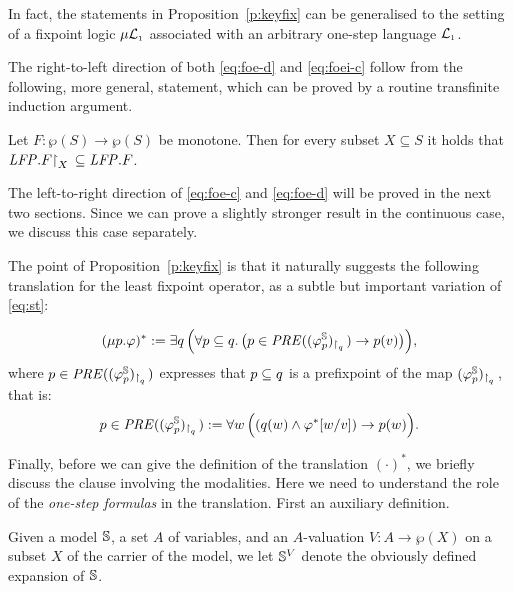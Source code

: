 \begin{remark}
In fact, the statements in Proposition~\ref{p:keyfix} can be generalised to the
setting of a fixpoint logic $\mu\mathcal{L}_{\scriptscriptstyle 1}$ associated with an arbitrary one-step 
language $\mathcal{L}_{\scriptscriptstyle 1}$.
\end{remark}

The right-to-left direction of both \eqref{eq:foe-d} and \eqref{eq:foei-c} follow
from the following, more general, statement, which can be proved by a routine 
transfinite induction argument.

\begin{proposition}
\label{p:rstfix}
Let $F:  \wp(S)\to \wp(S)$ be monotone.
Then for every subset $X \subseteq S$ it holds that $\mathit{LFP}. F{\upharpoonright}_{X}\,\subseteq 
\mathit{LFP}.F$.
\end{proposition}

The left-to-right direction of \eqref{eq:foe-c} and \eqref{eq:foe-d} 
will be proved in the next two sections.
Since we can prove a slightly stronger result in the continuous case, we discuss
this case separately.

\newcommand{\PRE}{\mathit{PRE}}
The point of Proposition~\ref{p:keyfix} is that it naturally suggests the
following translation for the least fixpoint operator, as a subtle but important 
variation of \eqref{eq:st}:

\begin{equation}
\label{eq:trlmu}
(\mu p. \varphi)^{*} \df 
   \exists q\,\Big(\forall  p \subseteq q.\,
      \big(p \in \PRE((\varphi^{\model}_{p})_{\rst{q}}) \to p(v)\big)\Big),
\end{equation}
where $p \in \PRE((\varphi^{\model}_{p})_{\rst{q}})$ expresses that $p \subseteq q$ 
is a prefixpoint of the map $(\varphi^{\mathbb{S}}_{p})_{{\upharpoonright}_{q}\,}$, that is:
\[
p  \in \PRE((\varphi^{\model}_{p})_{\rst{q}}) \df
\forall w\, \Big(
( q(w) \land \varphi^{*}[w/v]) \to p(w)
\Big).
\]

Finally, before we can give the definition of the translation $(\cdot)^{*}$, we
briefly discuss the clause involving the modalities.
Here we need to understand the role of the \emph{one-step formulas} in the 
translation.
First an auxiliary definition.

\begin{definition}
Given a model $\mathbb{S}$, a set $A$ of variables, and an $A$-valuation $V: A \to
\wp(X)$ on a subset $X$ of the carrier of the model, we let $\mathbb{S}^{V}$ denote
the obviously defined expansion of $\mathbb{S}$.
\end{definition}

